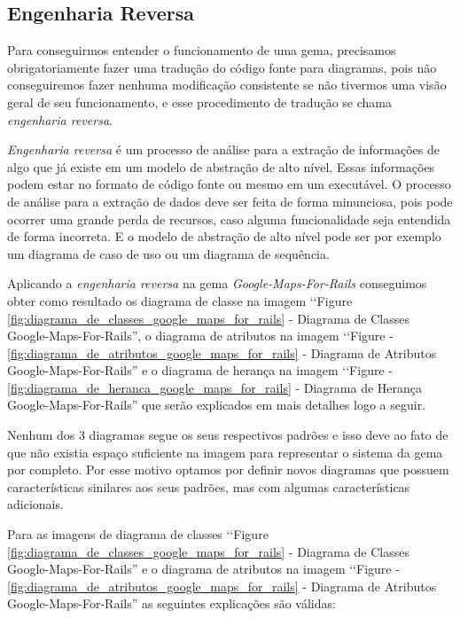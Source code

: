 \subsection{Engenharia Reversa}
\label{subsection:engenharia_reversa}

Para conseguirmos entender o funcionamento de uma gema, precisamos obrigatoriamente fazer uma tradução
do código fonte para diagramas, pois não conseguiremos fazer nenhuma modificação consistente
se não tivermos uma visão geral de seu funcionamento, e esse procedimento de tradução se chama 
\emph{engenharia reversa}.

\emph{Engenharia reversa} é um processo de análise para a extração de informações de algo que já 
existe em um modelo de abstração de alto nível. Essas informações podem estar no formato de código 
fonte ou mesmo em um executável. O processo de análise para a extração de dados deve ser feita de forma
minunciosa, pois pode ocorrer uma grande perda de recursos, caso alguma funcionalidade seja entendida de
forma incorreta. E o modelo de abstração de alto nível pode ser por exemplo um diagrama de caso de uso ou
um diagrama de sequência.

Aplicando a \emph{engenharia reversa} na gema \emph{Google-Maps-For-Rails} conseguimos obter como resultado
os diagrama de classe na imagem ‘‘Figure \ref{fig:diagrama_de_classes_google_maps_for_rails} - Diagrama de 
Classes Google-Maps-For-Rails'', o diagrama de atributos na imagem ‘‘Figure - 
\ref{fig:diagrama_de_atributos_google_maps_for_rails} - Diagrama de Atributos Google-Maps-For-Rails'' e o 
diagrama de herança na imagem ‘‘Figure - \ref{fig:diagrama_de_heranca_google_maps_for_rails} - Diagrama de 
Herança Google-Maps-For-Rails'' que serão explicados em mais detalhes logo a seguir.

Nenhum dos 3 diagramas segue os seus respectivos padrões e isso deve ao fato de que não existia espaço 
suficiente na imagem para representar o sistema da gema por completo. Por esse motivo optamos por definir 
novos diagramas que possuem características sinilares aos seus padrões, mas com algumas características
adicionais.

Para as imagens de diagrama de classes ‘‘Figure \ref{fig:diagrama_de_classes_google_maps_for_rails} - 
Diagrama de Classes Google-Maps-For-Rails'' e o diagrama de atributos na imagem ‘‘Figure - 
\ref{fig:diagrama_de_atributos_google_maps_for_rails} - Diagrama de Atributos Google-Maps-For-Rails''
as seguintes explicações são válidas:

